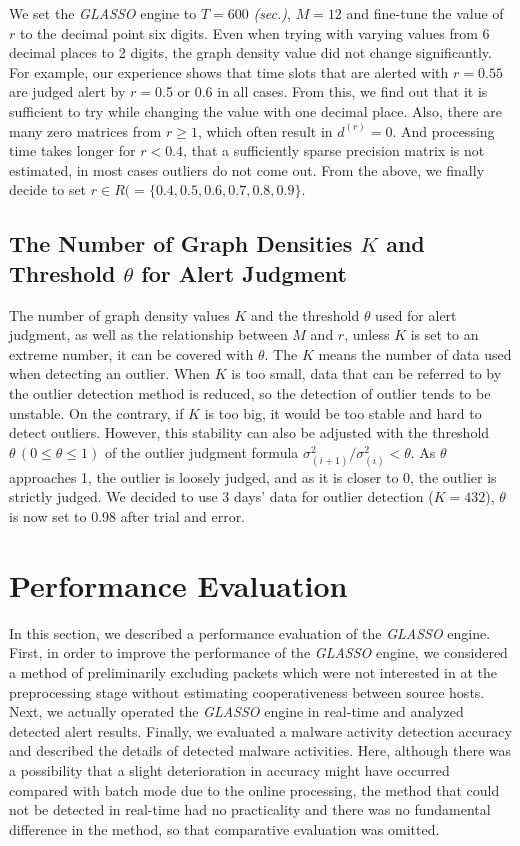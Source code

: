 \documentclass[conference]{IEEEtran}
\begin{document}
We set the {\it GLASSO} engine to $T=600$ {\it (sec.)}, $M=12$ and fine-tune the value of $r$ to the decimal point six digits.
Even when trying with varying values from 6 decimal places to 2 digits, the graph density value did not change significantly.
For example, our experience shows that time slots that are alerted with $r=0.55$ are judged alert by $r=$0.5 or 0.6 in all cases.
From this, we find out that it is sufficient to try while changing the value with one decimal place.
Also, there are many zero matrices from $r\geq 1$, which often result in $d^{(r)}=0$.
And processing time takes longer for $r < 0.4$, that a sufficiently sparse precision matrix is not estimated, in most cases outliers do not come out.
From the above, we finally decide to set $r \in R ( = \{0.4, 0.5, 0.6, 0.7, 0.8, 0.9\}$.



\subsection{The Number of Graph Densities $K$ and Threshold $\theta$ for Alert Judgment}
The number of graph density values $K$ and the threshold $\theta$ used for alert judgment, as well as the relationship between $M$ and $r$, unless $K$ is set to an extreme number, it can be covered with $\theta$.
The $K$ means the number of data used when detecting an outlier.
When $K$ is too small, data that can be referred to by the outlier detection method is reduced, so the detection of outlier tends to be unstable.
On the contrary, if $K$ is too big, it would be too stable and hard to detect outliers.
However, this stability can also be adjusted with the threshold $\theta \, (0\leq \theta \leq 1)$ of the outlier judgment formula $\sigma^{2}_{(i+1)}/\sigma^{2}_{(i)}<\theta$.
As $\theta$ approaches 1, the outlier is loosely judged, and as it is closer to 0, the outlier is strictly judged.
We decided to use 3 days' data for outlier detection ($K=432$), $\theta$ is now set to 0.98 after trial and error.



\section{Performance Evaluation}
In this section, we described a performance evaluation of the {\it GLASSO} engine.
First, in order to improve the performance of the {\it GLASSO} engine, we considered a method of preliminarily excluding packets which were not interested in at the preprocessing stage without estimating cooperativeness between source hosts.
Next, we actually operated the {\it GLASSO} engine in real-time and analyzed detected alert results.
Finally, we evaluated a malware activity detection accuracy and described the details of detected malware activities.
Here, although there was a possibility that a slight deterioration in accuracy might have occurred compared with batch mode due to the online processing, the method that could not be detected in real-time had no practicality and there was no fundamental difference in the method, so that comparative evaluation was omitted.
\end{document}
